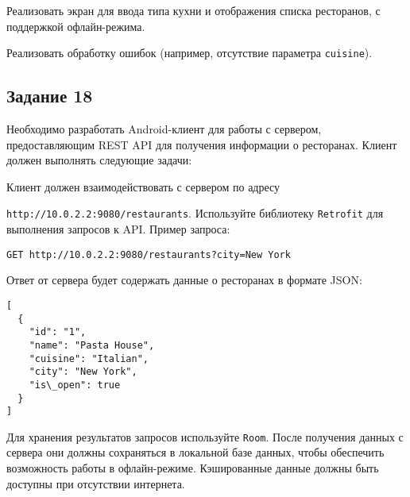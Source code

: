 \documentclass[a4paper,12pt]{article}
\begin{document}
Реализовать экран для ввода типа кухни и отображения списка ресторанов, с поддержкой офлайн-режима.

Реализовать обработку ошибок (например, отсутствие параметра \texttt{cuisine}).

\subsection*{Задание 18}

Необходимо разработать Android-клиент для работы с сервером, предоставляющим REST API для получения информации о ресторанах. Клиент должен выполнять следующие задачи:

Клиент должен взаимодействовать с сервером по адресу 

\texttt{http://10.0.2.2:9080/restaurants}. Используйте библиотеку \texttt{Retrofit} для выполнения запросов к API. Пример запроса:

\begin{verbatim}
GET http://10.0.2.2:9080/restaurants?city=New York
\end{verbatim}

Ответ от сервера будет содержать данные о ресторанах в формате JSON:

\begin{verbatim}
[
  {
    "id": "1",
    "name": "Pasta House",
    "cuisine": "Italian",
    "city": "New York",
    "is\_open": true
  }
]
\end{verbatim}

Для хранения результатов запросов используйте \texttt{Room}. После получения данных с сервера они должны сохраняться в локальной базе данных, чтобы обеспечить возможность работы в офлайн-режиме. Кэшированные данные должны быть доступны при отсутствии интернета.
\end{document}
